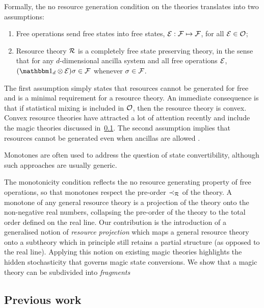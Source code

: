 \documentclass[pra,
aps,
twocolumn,
superscriptaddress,
groupedaddress,
nofootinbib,
reprint
]{revtex4-1}
\begin{document}
Formally, the no resource generation condition on the theories translates into two assumptions:
\begin{enumerate}[I]
    \item Free operations send free states into free states, $\mathcal{E}: \mathcal{F} \mapsto \mathcal{F}$, for all $\mathcal{E} \in \mathcal{O}$;
    \item Resource theory $\mathcal{R}$ is a completely free state preserving theory, in the sense that for any $d$-dimensional ancilla system and all free operations $\mathcal{E}$, $(\id_d \otimes \E ) \sigma \in \F$ whenever $\sigma \in \mathcal{F}$.
\end{enumerate}
The first assumption simply states that resources cannot be generated for free and is a minimal requirement for a resource theory. 
An immediate consequence is that if statistical mixing is included in $\mathcal{O}$, then the resource theory is convex.
Convex resource theories have attracted a lot of attention recently  and include the magic theories discussed in~\cref{sec:prev}.
The second assumption implies that resources cannot be generated even when ancillas are allowed .

Monotones are often used  to address the question of state convertibility, although such approaches are usually generic.

The monotonicity condition reflects the no resource generating property of free operations, so that monotones respect the pre-order $\prec_{\mathcal{R}}$ of the theory.
A monotone of any general resource theory is a projection of the theory onto the non-negative real numbers, collapsing the pre-order of the theory to the total order defined on the real line.
Our contribution is the introduction of a generalised notion of \emph{resource projection} which maps a general resource theory onto a subtheory which in principle still retains a partial structure (as opposed to the real line).
Applying this notion on existing magic theories highlights the hidden stochasticity that governs magic state conversions.
We show that a magic theory can be subdivided into \emph{fragments} 

\subsection{Previous work}
\label{sec:prev}

\end{document}
